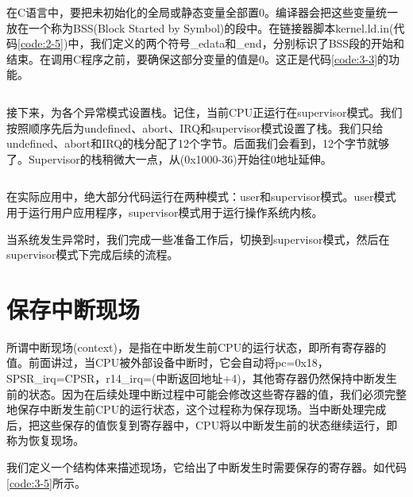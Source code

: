 \documentclass[main.tex]{subfiles}
\begin{document}
\begin{CJK*}{UTF8}{song}
\begin{code}
\label{code:3-2}
\inputminted[firstline=106,lastline=112,linenos,numbersep=5pt,frame=lines,framesep=2mm]{gas}{src/chapter03/kernel/entry.S}
\end{code}

在C语言中，要把未初始化的全局或静态变量全部置0。编译器会把这些变量统一放在一个称为BSS(Block Started by Symbol)的段中。在链接器脚本kernel.ld.in(代码\ref{code:2-5})中，我们定义的两个符号\_edata和\_end，分别标识了BSS段的开始和结束。在调用C程序之前，要确保这部分变量的值是0。这正是代码\ref{code:3-3}的功能。

\begin{code}
\label{code:3-3}
\inputminted[firstline=114,lastline=123,linenos,numbersep=5pt,frame=lines,framesep=2mm]{gas}{src/chapter03/kernel/entry.S}
\end{code}

接下来，为各个异常模式设置栈。记住，当前CPU正运行在supervisor模式。我们按照顺序先后为undefined、abort、IRQ和supervisor模式设置了栈。我们只给undefined、abort和IRQ的栈分配了12个字节。后面我们会看到，12个字节就够了。Supervisor的栈稍微大一点，从(0x1000-36)开始往0地址延伸。
\begin{code}
\label{code:3-4}
\inputminted[firstline=125,lastline=142,linenos,numbersep=5pt,frame=lines,framesep=2mm]{gas}{src/chapter03/kernel/entry.S}
\end{code}

在实际应用中，绝大部分代码运行在两种模式：user和supervisor模式。user模式用于运行用户应用程序，supervisor模式用于运行操作系统内核。
\par
当系统发生异常时，我们完成一些准备工作后，切换到supervisor模式，然后在supervisor模式下完成后续的流程。

\section{保存中断现场}
所谓中断现场(context)，是指在中断发生前CPU的运行状态，即所有寄存器的值。前面讲过，当CPU被外部设备中断时，它会自动将pc=0x18，SPSR\_irq=CPSR，r14\_irq=(中断返回地址+4)，其他寄存器仍然保持中断发生前的状态。因为在后续处理中断过程中可能会修改这些寄存器的值，我们必须完整地保存中断发生前CPU的运行状态，这个过程称为保存现场。当中断处理完成后，把这些保存的值恢复到寄存器中，CPU将以中断发生前的状态继续运行，即称为恢复现场。

\par
我们定义一个结构体来描述现场，它给出了中断发生时需要保存的寄存器。如代码\ref{code:3-5}所示。


\end{CJK*}
\end{document}
